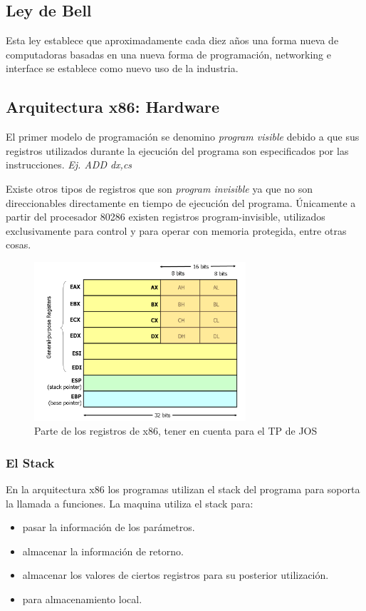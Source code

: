 \documentclass[titlepage,a4paper]{article}
\begin{document}
\subsection*{Ley de Bell}
Esta ley establece que aproximadamente cada diez años una forma nueva de computadoras basadas en una nueva forma de programación, networking e interface se establece como nuevo uso de la industria.


\subsection*{Arquitectura x86: Hardware}
El primer modelo de programación se denomino \textit{program visible} debido a que sus registros utilizados durante la ejecución del programa son especificados por las instrucciones. \textit{Ej. ADD dx,cs}

Existe otros tipos de registros que son \textit{program invisible} ya que no son direccionables directamente en tiempo de ejecución del programa. Únicamente a partir del procesador 80286 existen registros program-invisible, utilizados exclusivamente para control y para operar con memoria protegida, entre otras cosas.

\begin{figure}[!htb]
    \centering
    \includegraphics[width=0.7\textwidth]{ImagenesApunte/registrosX86.png}
    \caption{Parte de los registros de x86, tener en cuenta para el TP de JOS}
\end{figure}

\subsubsection*{El Stack}

En la arquitectura x86 los programas utilizan el stack del programa para soporta la llamada a funciones. La maquina utiliza el stack para:
\begin{itemize}
    \item pasar la información de los parámetros.
    \item almacenar la información de retorno.
    \item almacenar los valores de ciertos registros para su posterior utilización.
    \item para almacenamiento local.
\end{itemize}
\end{document}
